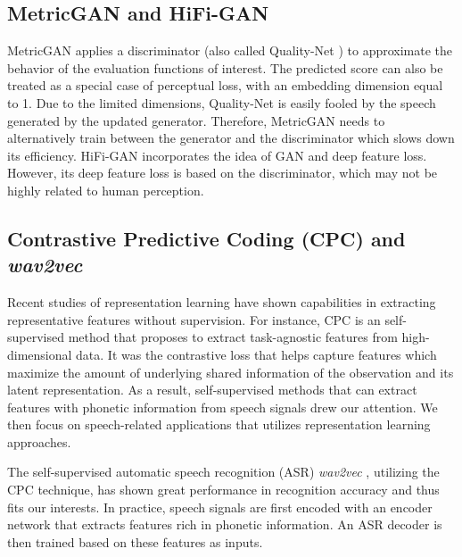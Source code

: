 \documentclass[a4paper]{article}
\begin{document}
\subsection{MetricGAN and HiFi-GAN}
\label{ssec:gan}
 MetricGAN \cite{fu2019metricgan} applies a discriminator (also called Quality-Net \cite{fu2018quality}) to approximate the behavior of the evaluation functions of interest. The predicted score can also be treated as a special case of perceptual loss, with an embedding dimension equal to 1. Due to the limited dimensions, Quality-Net is easily fooled by the speech generated by the updated generator. Therefore, MetricGAN needs to alternatively train between the generator and the discriminator which slows down its efficiency. HiFi-GAN \cite{su2020hifi} incorporates the idea of GAN and deep feature loss. However, its deep feature loss is based on the discriminator, which may not be highly related to human perception.

\subsection{Contrastive Predictive Coding (CPC) and \textit{wav2vec}}
\label{ssec:cpc_w2v}
Recent studies of representation learning have shown capabilities in extracting representative features without supervision.
For instance, CPC \cite{oord2018representation} is an self-supervised method that proposes to extract task-agnostic features from high-dimensional data. It was the contrastive loss that helps capture features which maximize the amount of underlying shared information of the observation and its latent representation.
As a result, self-supervised methods that can extract features with phonetic information from speech signals drew our attention.
We then focus on speech-related applications that utilizes representation learning approaches.
\par
The self-supervised automatic speech recognition (ASR) \textit{wav2vec} \cite{schneider2019wav2vec}, utilizing the CPC technique, has shown great performance in recognition accuracy and thus fits our interests. In practice, speech signals are first encoded with an encoder network that extracts features rich in phonetic information.
An ASR decoder is then trained based on these features as inputs.
\end{document}
